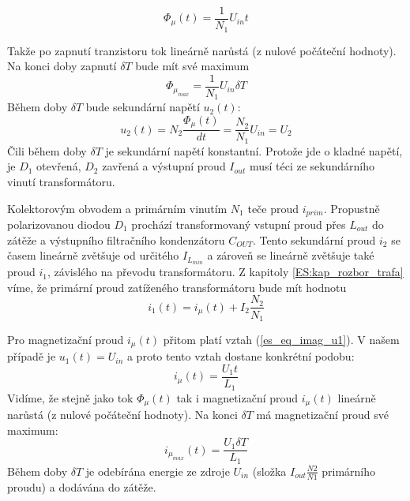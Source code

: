     \begin{equation}\label{ENZ:eq_forward_phi_mag}
     \Phi_\mu(t)=\frac{1}{N_1}U_{in}t
    \end{equation}
    
    Takže po zapnutí tranzistoru tok lineárně narůstá (z nulové počáteční hodnoty). Na konci doby 
    zapnutí $\delta T$ bude mít své maximum 
    \begin{equation}\label{ENZ:eq_forward_phi_max}
     \Phi_{\mu_{max}}=\frac{1}{N_1}U_{in}\delta T
    \end{equation}
    Během doby $\delta T$ bude sekundární napětí $u_{2}(t)$:
    \begin{equation}\label{ENZ:eq_forward_usec}
     u_{2}(t) = N_2\frac{\Phi_\mu(t)}{dt} = \frac{N_2}{N_1}U_{in} = U_{2}
    \end{equation}
    Čili během doby $\delta T$ je sekundární napětí konstantní. Protože jde o kladné napětí, je 
    $D_1$ otevřená, $D_2$ zavřená a výstupní proud $I_{out}$ musí téci ze sekundárního vinutí 
    transformátoru.
    
    Kolektorovým obvodem a primárním vinutím $N_1$ teče proud $i_{prim}$. Propustně polarizovanou 
    diodou $D_1$ prochází transformovaný vstupní proud přes $L_{out}$ do zátěže a výstupního 
    filtračního kondenzátoru $C_{OUT}$. Tento sekundární proud $i_2$ se časem lineárně zvětšuje  
    od určitého $I_{L_{min}}$ a zároveň se lineárně zvětšuje také proud $i_1$, závislého na 
    převodu transformátoru. Z kapitoly \ref{ES:kap_rozbor_trafa} víme, že primární proud 
    zatíženého transformátoru bude mít hodnotu
    \begin{equation}\label{ENZ:eq_forward_iprim}
    i_1(t) = i_\mu(t) + I_2\frac{N_2}{N_1}
    \end{equation} 
    
    Pro magnetizační proud $i_\mu(t)$ přitom platí vztah (\ref{es_eq_imag_u1}). V našem případě je
    $u_1(t)=U_{in}$ a proto tento vztah dostane konkrétní podobu:
    \begin{equation}\label{ENZ:eq_forward_imagt}
     i_\mu(t) = \frac{U_1t}{L_1}
    \end{equation}
    Vidíme, že stejně jako tok $\Phi_\mu(t)$ tak i magnetizační proud $i_\mu(t)$ lineárně narůstá 
    (z nulové počáteční hodnoty). Na konci $\delta T$ má magnetizační proud své maximum:
    \begin{equation}\label{ENZ:eq_forward_imag_max}
     i_{\mu_{max}}(t) = \frac{U_1\delta T}{L_1}
    \end{equation}
    Během doby $\delta T$ je odebírána energie ze zdroje $U_{in}$ (složka $I_{out}\frac{N2}{N1}$
    primárního proudu) a dodávána do zátěže.
    
